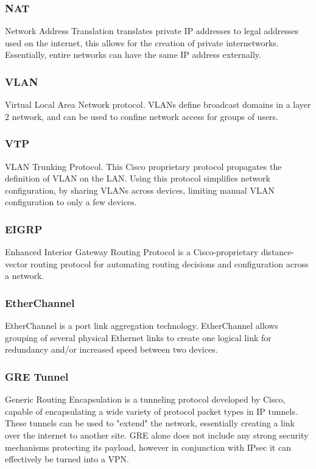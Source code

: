 \subsubsection{NAT}
\vspace{-0.6em}
Network Address Translation translates private IP addresses to legal addresses used on the internet, this allows for the creation of private internetworks. 
Essentially, entire networks can have the same IP address externally.

\subsubsection{VLAN}
\vspace{-0.6em}
Virtual Local Area Network protocol.
VLANs define broadcast domains in a layer 2 network, \cite{VLAN} and can be used to confine network access for groups of users.

\subsubsection{VTP}
\vspace{-0.6em}
VLAN Trunking Protocol.
This Cisco proprietary protocol propagates the definition of VLAN on the LAN.\cite{VTP} 
Using this protocol simplifies network configuration, by sharing VLANs across devices, limiting manual VLAN configuration to only a few devices.

\subsubsection{EIGRP}
\vspace{-0.6em}
Enhanced Interior Gateway Routing Protocol is a Cisco-proprietary distance-vector routing protocol for automating routing decisions and configuration across a network. \cite{EIGRP}

\subsubsection{EtherChannel}
\vspace{-0.6em}
EtherChannel is a port link aggregation technology. EtherChannel allows grouping of several physical Ethernet links to create one logical link for redundancy and/or increased speed between two devices. \cite{EtherChannel}

\subsubsection{GRE Tunnel}
\vspace{-0.6em}
Generic Routing Encapsulation is a tunneling protocol developed by Cisco, capable of encapsulating a wide variety of protocol packet types in IP tunnels. \cite{CCNP-ROUTE}
These tunnels can be used to "extend" the network, essentially creating a link over the internet to another site.
GRE alone does not include any strong security mechanisms protecting its payload, however in conjunction with IPsec it can effectively be turned into a VPN.

